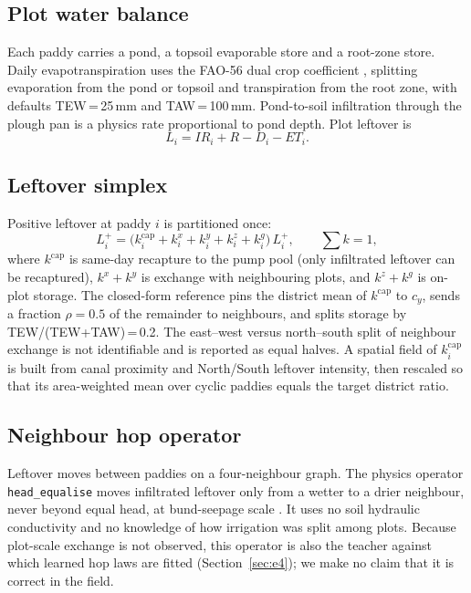 \documentclass[preprint,12pt,authoryear,review]{elsarticle}
\begin{document}
\subsection{Plot water balance}

Each paddy carries a pond, a topsoil evaporable store and a root-zone store. Daily evapotranspiration uses the FAO-56 dual crop coefficient \citep{allen1998}, splitting evaporation from the pond or topsoil and transpiration from the root zone, with defaults TEW\,=\,25\,mm and TAW\,=\,100\,mm. Pond-to-soil infiltration through the plough pan is a physics rate proportional to pond depth. Plot leftover is
\begin{equation}
L_i = IR_i + R - D_i - ET_i.
\label{eq:plotL}
\end{equation}

\subsection{Leftover simplex}

Positive leftover at paddy $i$ is partitioned once:
\begin{equation}
L_i^{+} = \big(k^{\mathrm{cap}}_i + k^{x}_i + k^{y}_i + k^{z}_i + k^{g}_i\big)\,L_i^{+}, \qquad \sum k = 1,
\label{eq:simplex}
\end{equation}
where $k^{\mathrm{cap}}$ is same-day recapture to the pump pool (only infiltrated leftover can be recaptured), $k^{x}+k^{y}$ is exchange with neighbouring plots, and $k^{z}+k^{g}$ is on-plot storage. The closed-form reference pins the district mean of $k^{\mathrm{cap}}$ to $c_y$, sends a fraction $\rho=0.5$ of the remainder to neighbours, and splits storage by TEW/(TEW+TAW)\,=\,0.2. The east--west versus north--south split of neighbour exchange is not identifiable and is reported as equal halves. A spatial field of $k^{\mathrm{cap}}_i$ is built from canal proximity and North/South leftover intensity, then rescaled so that its area-weighted mean over cyclic paddies equals the target district ratio.

\subsection{Neighbour hop operator}

Leftover moves between paddies on a four-neighbour graph. The physics operator \texttt{head\_equalise} moves infiltrated leftover only from a wetter to a drier neighbour, never beyond equal head, at bund-seepage scale \citep{walker1986,janssen2009}. It uses no soil hydraulic conductivity and no knowledge of how irrigation was split among plots. Because plot-scale exchange is not observed, this operator is also the teacher against which learned hop laws are fitted (Section~\ref{sec:e4}); we make no claim that it is correct in the field.
\end{document}
